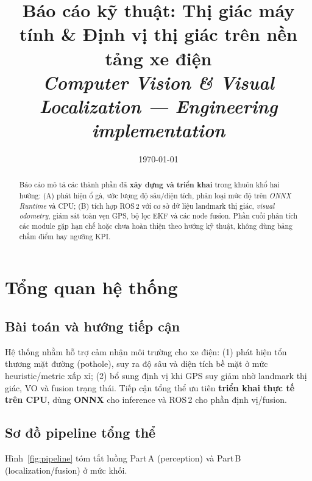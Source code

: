 \documentclass[12pt,a4paper]{article}
\title{\textbf{Báo cáo kỹ thuật: Thị giác máy tính \& Định vị thị giác trên nền tảng xe điện}\\[0.5em]
\large \textit{Computer Vision \& Visual Localization --- Engineering implementation}}
\author{\placeholder{TÊN BẠN}}
\date{\today}
\begin{document}
\maketitle

\begin{abstract}
\noindent
Báo cáo mô tả các thành phần đã \textbf{xây dựng và triển khai} trong khuôn khổ hai hướng: (A) phát hiện ổ gà, ước lượng độ sâu/diện tích, phân loại mức độ trên \emph{ONNX Runtime} và CPU; (B) tích hợp ROS\,2 với cơ sở dữ liệu landmark thị giác, \emph{visual odometry}, giám sát toàn vẹn GPS, bộ lọc EKF và các node fusion. Phần cuối phân tích các module gặp hạn chế hoặc chưa hoàn thiện theo hướng kỹ thuật, không dùng bảng chấm điểm hay ngưỡng KPI.
\end{abstract}

\section{Tổng quan hệ thống}

\subsection{Bài toán và hướng tiếp cận}
Hệ thống nhằm hỗ trợ cảm nhận môi trường cho xe điện: (1) phát hiện tổn thương mặt đường (pothole), suy ra độ sâu và diện tích bề mặt ở mức heuristic/metric xấp xỉ; (2) bổ sung định vị khi GPS suy giảm nhờ landmark thị giác, VO và fusion trạng thái. Tiếp cận tổng thể ưu tiên \textbf{triển khai thực tế trên CPU}, dùng \textbf{ONNX} cho inference và ROS\,2 cho phần định vị/fusion.

\subsection{Sơ đồ pipeline tổng thể}
Hình~\ref{fig:pipeline} tóm tắt luồng Part\,A (perception) và Part\,B (localization/fusion) ở mức khối.
\end{document}
